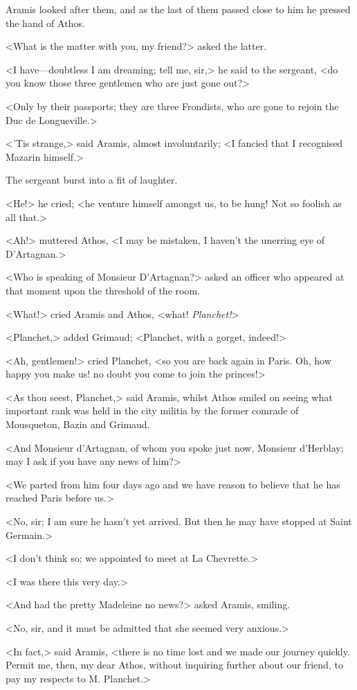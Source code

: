 Aramis looked after them, and as the last of them passed close to him he pressed the hand of Athos.

<What is the matter with you, my friend?> asked the latter.

<I have—doubtless I am dreaming; tell me, sir,> he said to the sergeant, <do you know those three gentlemen who are just gone out?>

<Only by their passports; they are three Frondists, who are gone to rejoin the Duc de Longueville.>

<'Tis strange,> said Aramis, almost involuntarily; <I fancied that I recognised Mazarin himself.>

The sergeant burst into a fit of laughter.

<He!> he cried; <he venture himself amongst us, to be hung! Not so foolish as all that.>

<Ah!> muttered Athos, <I may be mistaken, I haven't the unerring eye of D'Artagnan.>

<Who is speaking of Monsieur D'Artagnan?> asked an officer who appeared at that moment upon the threshold of the room.

<What!> cried Aramis and Athos, <what! \textit{Planchet!}>

<Planchet,> added Grimaud; <Planchet, with a gorget, indeed!>

<Ah, gentlemen!> cried Planchet, <so you are back again in Paris. Oh, how happy you make us! no doubt you come to join the princes!>

<As thou seest, Planchet,> said Aramis, whilst Athos smiled on seeing what important rank was held in the city militia by the former comrade of Mousqueton, Bazin and Grimaud.

<And Monsieur d'Artagnan, of whom you spoke just now, Monsieur d'Herblay; may I ask if you have any news of him?>

<We parted from him four days ago and we have reason to believe that he has reached Paris before us.>

<No, sir; I am sure he hasn't yet arrived. But then he may have stopped at Saint Germain.>

<I don't think so; we appointed to meet at La Chevrette.>

<I was there this very day.>

<And had the pretty Madeleine no news?> asked Aramis, smiling.

<No, sir, and it must be admitted that she seemed very anxious.>

<In fact,> said Aramis, <there is no time lost and we made our journey quickly. Permit me, then, my dear Athos, without inquiring further about our friend, to pay my respects to M. Planchet.>

